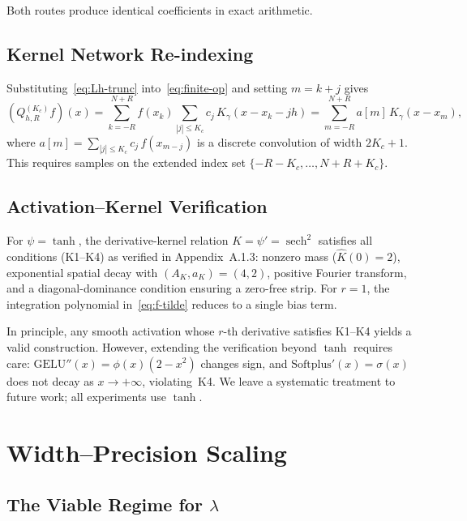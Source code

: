 \documentclass{article}
\begin{document}
Both routes produce identical coefficients in exact arithmetic.

\subsection{Kernel Network Re-indexing}
\label{app:kernel-reindexing}

Substituting~\eqref{eq:Lh-trunc} into~\eqref{eq:finite-op} and setting \(m = k+j\) gives
\[
  (Q_{h,R}^{(K_c)} f)(x)
  = \sum_{k=-R}^{N+R} f(x_k)\sum_{|j|\le K_c} c_j\,K_\gamma(x-x_k-jh)
  = \sum_{m=-R}^{N+R} a[m]\,K_\gamma(x-x_m),
\]
where \(a[m] = \sum_{|j|\le K_c} c_j\,f(x_{m-j})\) is a discrete convolution of width \(2K_c+1\).  This requires samples on the extended index set \(\{-R-K_c,\ldots,N+R+K_c\}\).

\subsection{Activation--Kernel Verification}
\label{app:activation-coverage}

For \(\psi = \tanh\), the derivative-kernel relation \(K = \psi' = \operatorname{sech}^2\) satisfies all conditions (K1--K4) as verified in Appendix~A.1.3: nonzero mass (\(\widehat{K}(0) = 2\)), exponential spatial decay with \((A_K,a_K) = (4,2)\), positive Fourier transform, and a diagonal-dominance condition ensuring a zero-free strip.  For \(r=1\), the integration polynomial in~\eqref{eq:f-tilde} reduces to a single bias term.

In principle, any smooth activation whose \(r\)-th derivative satisfies K1--K4 yields a valid construction.  However, extending the verification beyond \(\tanh\) requires care: \(\mathrm{GELU}''(x) = \phi(x)(2-x^2)\) changes sign, and \(\mathrm{Softplus}'(x) = \sigma(x)\) does not decay as \(x\to+\infty\), violating~K4.  We leave a systematic treatment to future work; all experiments use \(\tanh\).


\section{Width--Precision Scaling}
\label{app:width-precision}

\subsection{The Viable Regime for \(\lambda\)}
\label{app:viable-lambda}
\end{document}
